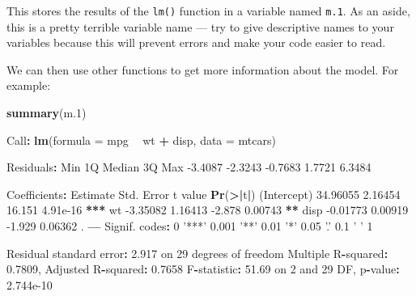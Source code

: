 \documentclass[]{article}
\newenvironment{Shaded}{\begin{snugshade}}{\end{snugshade}}
\newcommand{\DataTypeTok}[1]{\textcolor[rgb]{0.13,0.29,0.53}{#1}}
\newcommand{\DecValTok}[1]{\textcolor[rgb]{0.00,0.00,0.81}{#1}}
\newcommand{\ErrorTok}[1]{\textcolor[rgb]{0.64,0.00,0.00}{\textbf{#1}}}
\newcommand{\FloatTok}[1]{\textcolor[rgb]{0.00,0.00,0.81}{#1}}
\newcommand{\KeywordTok}[1]{\textcolor[rgb]{0.13,0.29,0.53}{\textbf{#1}}}
\newcommand{\NormalTok}[1]{#1}
\newcommand{\OperatorTok}[1]{\textcolor[rgb]{0.81,0.36,0.00}{\textbf{#1}}}
\newcommand{\StringTok}[1]{\textcolor[rgb]{0.31,0.60,0.02}{#1}}
\begin{document}
This stores the results of the \texttt{lm()} function in a variable named \texttt{m.1}. As an
aside, this is a pretty terrible variable name --- try to give descriptive names
to your variables because this will prevent errors and make your code easier to
read.

We can then use other functions to get more information about the model. For
example:

\begin{Shaded}
\begin{Highlighting}[]
\KeywordTok{summary}\NormalTok{(m}\FloatTok{.1}\NormalTok{)}

\NormalTok{Call}\OperatorTok{:}
\KeywordTok{lm}\NormalTok{(}\DataTypeTok{formula =}\NormalTok{ mpg }\OperatorTok{~}\StringTok{ }\NormalTok{wt }\OperatorTok{+}\StringTok{ }\NormalTok{disp, }\DataTypeTok{data =}\NormalTok{ mtcars)}

\NormalTok{Residuals}\OperatorTok{:}
\StringTok{    }\NormalTok{Min      1Q  Median      3Q     Max }
\FloatTok{-3.4087} \FloatTok{-2.3243} \FloatTok{-0.7683}  \FloatTok{1.7721}  \FloatTok{6.3484} 

\NormalTok{Coefficients}\OperatorTok{:}
\StringTok{            }\NormalTok{Estimate Std. Error t value }\KeywordTok{Pr}\NormalTok{(}\OperatorTok{>}\ErrorTok{|}\NormalTok{t}\OperatorTok{|}\NormalTok{)    }
\NormalTok{(Intercept) }\FloatTok{34.96055}    \FloatTok{2.16454}  \FloatTok{16.151} \FloatTok{4.91e-16} \OperatorTok{**}\ErrorTok{*}
\NormalTok{wt          }\FloatTok{-3.35082}    \FloatTok{1.16413}  \FloatTok{-2.878}  \FloatTok{0.00743} \OperatorTok{**}\StringTok{ }
\NormalTok{disp        }\FloatTok{-0.01773}    \FloatTok{0.00919}  \FloatTok{-1.929}  \FloatTok{0.06362}\NormalTok{ .  }
\OperatorTok{---}
\NormalTok{Signif. codes}\OperatorTok{:}\StringTok{  }\DecValTok{0} \StringTok{'***'} \FloatTok{0.001} \StringTok{'**'} \FloatTok{0.01} \StringTok{'*'} \FloatTok{0.05} \StringTok{'.'} \FloatTok{0.1} \StringTok{' '} \DecValTok{1}

\NormalTok{Residual standard error}\OperatorTok{:}\StringTok{ }\FloatTok{2.917}\NormalTok{ on }\DecValTok{29}\NormalTok{ degrees of freedom}
\NormalTok{Multiple R}\OperatorTok{-}\NormalTok{squared}\OperatorTok{:}\StringTok{  }\FloatTok{0.7809}\NormalTok{,    Adjusted R}\OperatorTok{-}\NormalTok{squared}\OperatorTok{:}\StringTok{  }\FloatTok{0.7658} 
\NormalTok{F}\OperatorTok{-}\NormalTok{statistic}\OperatorTok{:}\StringTok{ }\FloatTok{51.69}\NormalTok{ on }\DecValTok{2}\NormalTok{ and }\DecValTok{29}\NormalTok{ DF,  p}\OperatorTok{-}\NormalTok{value}\OperatorTok{:}\StringTok{ }\FloatTok{2.744e-10}
\end{Highlighting}
\end{Shaded}
\end{document}
